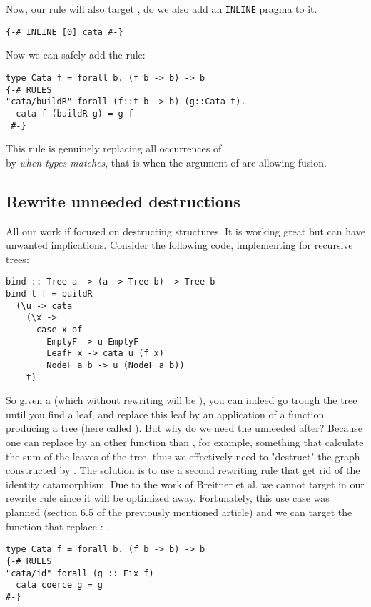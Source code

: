 Now, our rule will also target , do we also add an \verb|INLINE| pragma to it.
\begin{verbatim}
{-# INLINE [0] cata #-}
\end{verbatim}

Now we can safely add the rule:
\begin{verbatim}
type Cata f = forall b. (f b -> b) -> b
{-# RULES
"cata/buildR" forall (f::t b -> b) (g::Cata t).
  cata f (buildR g) = g f
 #-}
\end{verbatim}
This rule is genuinely replacing all occurrences of\\  by  \emph{when types matches}, that is when the argument of  are allowing fusion.

\subsection{Rewrite unneeded destructions}
All our work if focused on destructing structures. It is working great but can have unwanted implications. Consider the following code, implementing  for recursive trees:

\begin{verbatim}
bind :: Tree a -> (a -> Tree b) -> Tree b
bind t f = buildR
  (\u -> cata
    (\x ->
      case x of
        EmptyF -> u EmptyF
        LeafF x -> cata u (f x)
        NodeF a b -> u (NodeF a b))
    t)
\end{verbatim}

So given a  (which without rewriting will be ), you can indeed go trough the tree until you find a leaf, and replace this leaf by an application of a function producing a tree (here called ). But why do we need the unneeded  after? Because one can replace  by an other function than , for example, something that calculate the sum of the leaves of the tree, thus we effectively need to "destruct" the graph constructed by . The solution is to use a second rewriting rule that get rid of the identity catamorphism. Due to the work of Breitner et al. \cite{Breitner:2014:SZC:2692915.2628141} we cannot target  in our rewrite rule since it will be optimized away. Fortunately, this use case was planned (section 6.5 of the previously mentioned article) and we can target the function that replace : . 

\begin{verbatim}
type Cata f = forall b. (f b -> b) -> b
{-# RULES
"cata/id" forall (g :: Fix f)
  cata coerce g = g
#-}
\end{verbatim}

